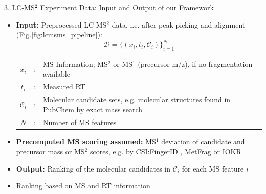 \documentclass{beamer}
\newcommand{\ms}{MS}
\newcommand{\lc}{LC}
\newcommand{\msone}{\ms$^1$}
\newcommand{\msms}{\ms$^2$}
\newcommand{\lcms}{\lc-\ms}
\newcommand{\lcmsms}{\lc-\msms}
\newcommand{\spec}{x}
\newcommand{\rt}{t}
\newcommand{\cands}{\mathcal{C}}
\newcommand{\seqlength}{N}
\begin{document}
\begin{frame}{}
\begin{columns}[T]
    \begin{block}{{\normalsize 3. \lcms$^\mathbf{2}$ Experiment Data: Input and Output of our Framework}}
    \begin{itemize}
        \item \textbf{Input:} Preprocessed \lcmsms{} data, i.e. after peak-picking and alignment (Fig.\ref{fig:lcmsms_pipeline}):
        \vspace{0.15cm}
            \begin{equation}
                \mathcal{D}=\{(\spec_i,\rt_i,\cands_i)\}_{i=1}^\seqlength
            \end{equation}
        \begin{tabularx}{\textwidth}{ccX}
            $\spec_i$ & : & \ms{} Information; \msms{} or \msone{} (precursor m/z), if no fragmentation available \\
            $\rt_i$ & : & Measured RT \\
            $\cands_i$ & : & {Molecular candidate sets, e.g. molecular structures found in PubChem by \newline exact mass search} \\
            $\seqlength$ & : & Number of \ms{} features   \\
        \end{tabularx}
        \vspace{0.025cm}
        \item \textbf{Precomputed \ms{} scoring assumed:} \msone{} deviation of candidate and precursor mass or \msms{} scores, e.g. by CSI:FingerID \cite{Duehrkop2019}, MetFrag \cite{Ruttkies2016} or IOKR \cite{Brouard_ismb_2016}
        \item \textbf{Output:} Ranking of the molecular candidates in $\mathcal{C}_i$ for each \ms{} feature $i$
        \item Ranking based on \ms{} and RT information
    \end{itemize}
    \end{block}


\hfill
{}


\end{columns}
\end{frame}
\end{document}
